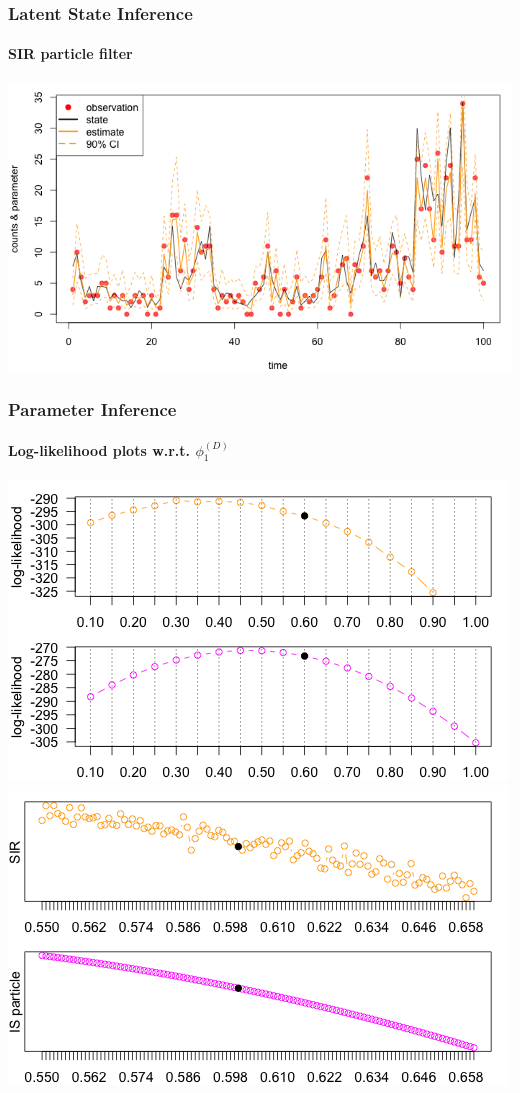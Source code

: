 \documentclass[11pt]{beamer}
\begin{document}
\begin{frame}
\frametitle{Latent State Inference}
\framesubtitle{SIR particle filter}
\centering
\includegraphics[scale=0.45]{hdpm-est}
\end{frame}

\begin{frame}
\frametitle{Parameter Inference}
\framesubtitle{Log-likelihood plots w.r.t. $\phi_1^{(D)}$}
\centering
\includegraphics[scale=0.30]{hdpm-loglik-Dphi1}
\includegraphics[scale=0.30]{hdpm-loglik-Dphi1-zoom}
\end{frame}
\end{document}
